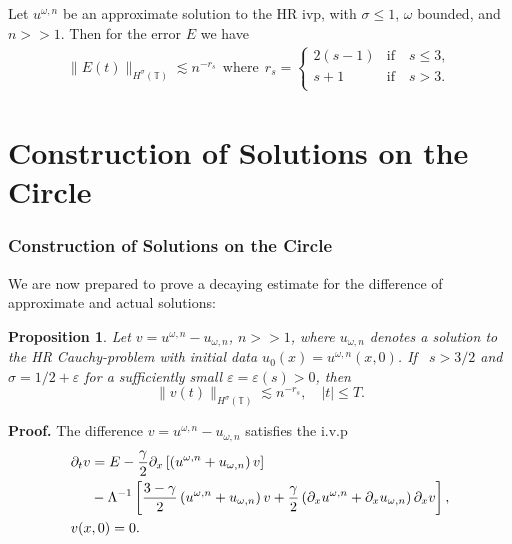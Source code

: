 \documentclass{beamer}
\newcommand{\p}{\partial}
\newcommand{\ci}{\mathbb{T}}
\newcommand{\ee}{\varepsilon}
\newtheorem{proposition}{Proposition}
\begin{document}
\begin{frame}

\begin{lemma}
\label{lem:error_of_approx_solution}
Let $u^{\omega,n}$ be an approximate solution to the HR ivp, with 
$\sigma \le 1$,  $\omega$ bounded, and $n >> 1$.
Then for the error $E$ we have
%
%
\begin{equation*}
\label{total-error-approx-solution}
\begin{split}
	\|E(t)\|_{H^\sigma(\ci)} \lesssim n^{-r_s} \ \ \text{where} \ \ r_s = 
\begin{cases}
2(s-1)   & \text{if} \quad s \le 3,\\  s+1  & \text{if} \quad s > 3. \\
\end{cases}
\end{split}
\end{equation*}
%
%
%
%
\end{lemma}

\end{frame}

\section{Construction of Solutions on the Circle}
\begin{frame}
	\frametitle{Construction of Solutions on the Circle}
We are now prepared to prove a decaying estimate for the difference of 
approximate and actual solutions:
%
%
\begin{proposition}
\label{prop:bound_for_difference-of-approx-actual-soln}
Let $v=u^{\omega,n} - u_{\omega,n}$, $n >>1$,
where $u_{\omega,n}$ denotes a solution to the HR
Cauchy-problem with
initial data $u_0(x) = u^{\omega,n}(x,0)$.
If \ $s > 3/2 $ and $\sigma = 1/2 + \ee$ for a sufficiently
small $\ee = \ee(s) > 0$, then 
%
%
\begin{equation*} \label{differ-Hsigma-est} \|
v(t)
\|_{H^\sigma(\ci)}
\lesssim n^{-r_s}, \quad |t| \le T.
\end{equation*}
%
%
\end{proposition}
%
%
\pause
{\bf Proof.} The difference $v = u^{\omega,n} - u_{\omega,n}$ satisfies 
the i.v.p
\begin{align*}
\label{1.7}
& \p_t v  =  E - \frac{\gamma}{2} \p_x
\left[ \left( u^{\omega,n} + u_{\omega,n} \right)v \right]
\\
\notag & \phantom{\p_t v} - \Lambda^{-1} \left[
\frac{3-\gamma}{2} \left( u^{\omega,n} + u_{\omega,n}
\right) v +
\frac{\gamma}{2}\left( \p_x u^{\omega,n} +
\p_x u_{\omega,n}
\right) \p_x v
\right], \\
& v(x,0)=0.
\end{align*}


\end{frame}
\end{document}
